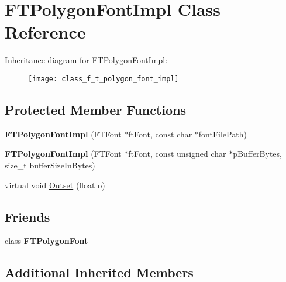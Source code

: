 \hypertarget{class_f_t_polygon_font_impl}{}\section{F\+T\+Polygon\+Font\+Impl Class Reference}
\label{class_f_t_polygon_font_impl}
Inheritance diagram for F\+T\+Polygon\+Font\+Impl\+:\begin{figure}[H]
\begin{center}
\leavevmode
\texttt{[image: class\_f\_t\_polygon\_font\_impl]}
\end{center}
\end{figure}
\subsection*{Protected Member Functions}
\begin{DoxyCompactItemize}
\item 
{\bfseries F\+T\+Polygon\+Font\+Impl} (F\+T\+Font $\ast$ft\+Font, const char $\ast$font\+File\+Path)\hypertarget{class_f_t_polygon_font_impl_adbe87469ee12af1a0a1b7999ede7cc98}{}\label{class_f_t_polygon_font_impl_adbe87469ee12af1a0a1b7999ede7cc98}

\item 
{\bfseries F\+T\+Polygon\+Font\+Impl} (F\+T\+Font $\ast$ft\+Font, const unsigned char $\ast$p\+Buffer\+Bytes, size\+\_\+t buffer\+Size\+In\+Bytes)\hypertarget{class_f_t_polygon_font_impl_a140310c1898543ff1dec5865841b630b}{}\label{class_f_t_polygon_font_impl_a140310c1898543ff1dec5865841b630b}

\item 
virtual void \hyperlink{class_f_t_polygon_font_impl_ac565010b774c7ddb84db28b422ea9b3e}{Outset} (float o)
\end{DoxyCompactItemize}
\subsection*{Friends}
\begin{DoxyCompactItemize}
\item 
class {\bfseries F\+T\+Polygon\+Font}\hypertarget{class_f_t_polygon_font_impl_abd1c273c43e47346ad6c178ec173cc41}{}\label{class_f_t_polygon_font_impl_abd1c273c43e47346ad6c178ec173cc41}

\end{DoxyCompactItemize}
\subsection*{Additional Inherited Members}


